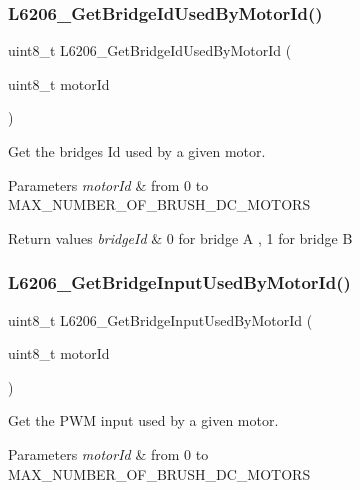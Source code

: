 \subsubsection{\texorpdfstring{L6206\+\_\+\+Get\+Bridge\+Id\+Used\+By\+Motor\+Id()}{L6206\_GetBridgeIdUsedByMotorId()}}
{\footnotesize\ttfamily uint8\+\_\+t L6206\+\_\+\+Get\+Bridge\+Id\+Used\+By\+Motor\+Id (\begin{DoxyParamCaption}\item[{uint8\+\_\+t}]{motor\+Id }\end{DoxyParamCaption})}



Get the bridges Id used by a given motor. 


\begin{DoxyParams}{Parameters}
{\em motor\+Id} & from 0 to M\+A\+X\+\_\+\+N\+U\+M\+B\+E\+R\+\_\+\+O\+F\+\_\+\+B\+R\+U\+S\+H\+\_\+\+D\+C\+\_\+\+M\+O\+T\+O\+RS \\
\hline
\end{DoxyParams}

\begin{DoxyRetVals}{Return values}
{\em bridge\+Id} & 0 for bridge A , 1 for bridge B \\
\hline
\end{DoxyRetVals}
\mbox{\label{group___l6206___private__functions_gad764d0c14a17388f39b97fe91175ed7b}} 
\subsubsection{\texorpdfstring{L6206\+\_\+\+Get\+Bridge\+Input\+Used\+By\+Motor\+Id()}{L6206\_GetBridgeInputUsedByMotorId()}}
{\footnotesize\ttfamily uint8\+\_\+t L6206\+\_\+\+Get\+Bridge\+Input\+Used\+By\+Motor\+Id (\begin{DoxyParamCaption}\item[{uint8\+\_\+t}]{motor\+Id }\end{DoxyParamCaption})}



Get the P\+WM input used by a given motor. 


\begin{DoxyParams}{Parameters}
{\em motor\+Id} & from 0 to M\+A\+X\+\_\+\+N\+U\+M\+B\+E\+R\+\_\+\+O\+F\+\_\+\+B\+R\+U\+S\+H\+\_\+\+D\+C\+\_\+\+M\+O\+T\+O\+RS \\
\hline
\end{DoxyParams}

